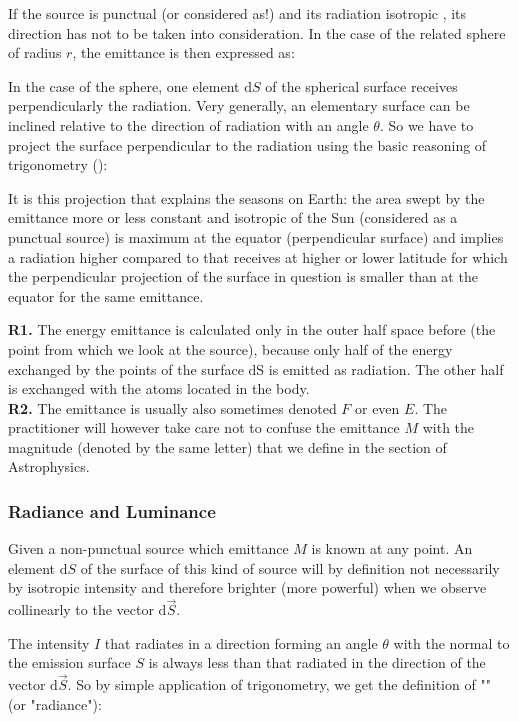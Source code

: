 	If the source is punctual (or considered as!) and its radiation isotropic , its direction has not to be taken into consideration. In the case of the related sphere of radius $r$, the emittance is then expressed as:
	
	In the case of the sphere, one element $\mathrm{d}S$ of the spherical surface receives perpendicularly the radiation. Very generally, an elementary surface can be inclined relative to the direction of radiation with an angle $\theta$. So we have to project the surface perpendicular to the radiation using the basic reasoning of trigonometry ():
	
	It is this projection that explains the seasons on Earth: the area swept by the emittance more or less constant and isotropic of the Sun (considered as a punctual source) is maximum at the equator (perpendicular surface) and implies a radiation higher compared to that receives at higher or lower latitude for which the perpendicular projection of the surface in question is smaller than at the equator for the same emittance.
	
	\begin{tcolorbox}[title=Remarks,colframe=black,arc=10pt]
	\textbf{R1.} The energy emittance is calculated only in the outer half space before (the point from which we look at the source), because only half of the energy exchanged by the points of the surface $\mathrm{d}$S is emitted as radiation. The other half is exchanged with the atoms located in the body.\\
	
	\textbf{R2.} The emittance is usually also sometimes denoted $F$ or even $E$. The practitioner will however take care not to confuse the emittance $M$ with the magnitude (denoted by the same letter) that we define in the section of Astrophysics.
	\end{tcolorbox}
	
	\subsubsection{Radiance and Luminance}
	Given a non-punctual source which emittance $M$ is known at any point. An element $\mathrm{d}S$ of the surface of this kind of source will by definition not necessarily by isotropic intensity and therefore brighter (more powerful) when we observe collinearly to the vector $\mathrm{d}\vec{S}$.
	
	The intensity $I$ that radiates in a direction forming an angle $\theta$ with the normal to the emission surface $S$ is always less than that radiated in the direction of the vector $\mathrm{d}\vec{S}$. So by simple application of trigonometry, we get the definition of "" (or "radiance"):
	

